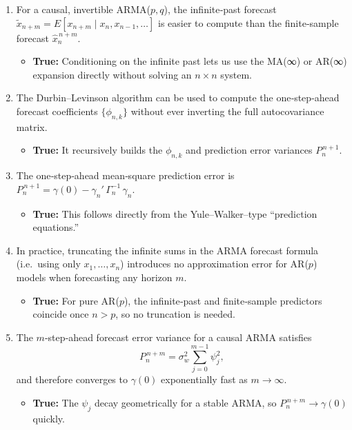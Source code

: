 \documentclass[11pt]{article}
\begin{document}
\begin{enumerate}
  \item For a causal, invertible ARMA(\(p,q\)), the infinite‐past forecast \(\tilde x_{n+m}=E[x_{n+m}\mid x_n,x_{n-1},\dots]\) is easier to compute than the finite‐sample forecast \(\hat x_{n}^{\,n+m}\).
  \begin{itemize}
    \item \textbf{True:} Conditioning on the infinite past lets us use the MA(∞) or AR(∞) expansion directly without solving an \(n\times n\) system.
  \end{itemize}

  \item The Durbin–Levinson algorithm can be used to compute the one‐step‐ahead forecast coefficients \(\{\phi_{n,k}\}\) without ever inverting the full autocovariance matrix.
  \begin{itemize}
    \item \textbf{True:} It recursively builds the \(\phi_{n,k}\) and prediction error variances \(P_{n}^{\,n+1}\).
  \end{itemize}

  \item The one‐step‐ahead mean‐square prediction error is \(P_{n}^{\,n+1}=\gamma(0)-\gamma_n'\,\Gamma_n^{-1}\,\gamma_n\).
  \begin{itemize}
    \item \textbf{True:} This follows directly from the Yule–Walker–type “prediction equations.”
  \end{itemize}

  \item In practice, truncating the infinite sums in the ARMA forecast formula (i.e.\ using only \(x_1,\dots,x_n\)) introduces no approximation error for AR(\(p\)) models when forecasting any horizon \(m\).
  \begin{itemize}
    \item \textbf{True:} For pure AR(\(p\)), the infinite‐past and finite‐sample predictors coincide once \(n>p\), so no truncation is needed.
  \end{itemize}

  \item The \(m\)-step‐ahead forecast error variance for a causal ARMA satisfies
  \[
    P_{n}^{\,n+m} = \sigma_w^2\sum_{j=0}^{m-1}\psi_j^2,
  \]
  and therefore converges to \(\gamma(0)\) exponentially fast as \(m\to\infty\).
  \begin{itemize}
    \item \textbf{True:} The \(\psi_j\) decay geometrically for a stable ARMA, so \(P_{n}^{\,n+m}\to\gamma(0)\) quickly.
  \end{itemize}


\end{enumerate}
\end{document}
